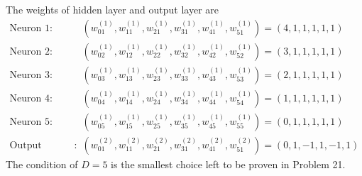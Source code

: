 \documentclass[12pt]{article}
\newcommand{\ParTh}[1]{\left(#1\right)}
\begin{document}
The weights of hidden layer and output layer are
\begin{align}
\text{Neuron 1}:&\ParTh{w^{\ParTh{1}}_{01},w^{\ParTh{1}}_{11},w^{\ParTh{1}}_{21},w^{\ParTh{1}}_{31},w^{\ParTh{1}}_{41},w^{\ParTh{1}}_{51}}=\ParTh{4,1,1,1,1,1}\\
\text{Neuron 2}:&\ParTh{w^{\ParTh{1}}_{02},w^{\ParTh{1}}_{12},w^{\ParTh{1}}_{22},w^{\ParTh{1}}_{32},w^{\ParTh{1}}_{42},w^{\ParTh{1}}_{52}}=\ParTh{3,1,1,1,1,1}\\
\text{Neuron 3}:&\ParTh{w^{\ParTh{1}}_{03},w^{\ParTh{1}}_{13},w^{\ParTh{1}}_{23},w^{\ParTh{1}}_{33},w^{\ParTh{1}}_{43},w^{\ParTh{1}}_{53}}=\ParTh{2,1,1,1,1,1}\\
\text{Neuron 4}:&\ParTh{w^{\ParTh{1}}_{04},w^{\ParTh{1}}_{14},w^{\ParTh{1}}_{24},w^{\ParTh{1}}_{34},w^{\ParTh{1}}_{44},w^{\ParTh{1}}_{54}}=\ParTh{1,1,1,1,1,1}\\
\text{Neuron 5}:&\ParTh{w^{\ParTh{1}}_{05},w^{\ParTh{1}}_{15},w^{\ParTh{1}}_{25},w^{\ParTh{1}}_{35},w^{\ParTh{1}}_{45},w^{\ParTh{1}}_{55}}=\ParTh{0,1,1,1,1,1}\\
\text{Output Neuron}:&\ParTh{w^{\ParTh{2}}_{01},w^{\ParTh{2}}_{11},w^{\ParTh{2}}_{21},w^{\ParTh{2}}_{31},w^{\ParTh{2}}_{41},w^{\ParTh{2}}_{51}}=\ParTh{0,1,-1,1,-1,1}
\end{align}
The condition of $D=5$ is the smallest choice left to be proven in Problem 21.

\end{document}
